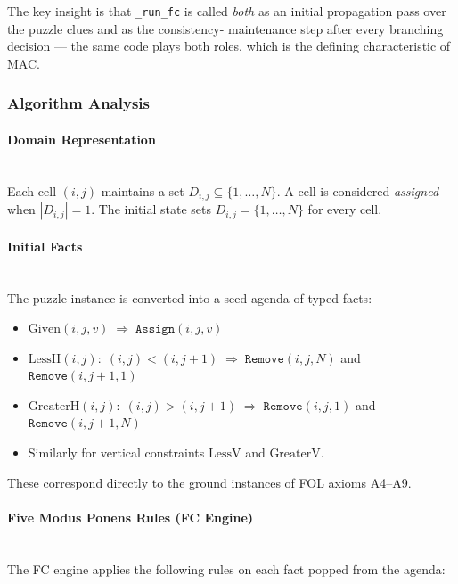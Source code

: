 The key insight is that \texttt{\_run\_fc} is called \emph{both} as an
initial propagation pass over the puzzle clues and as the consistency-
maintenance step after every branching decision — the same code plays both
roles, which is the defining characteristic of MAC.

\subsubsection{Algorithm Analysis}

\paragraph{Domain Representation}~\\
Each cell $(i,j)$ maintains a set $D_{i,j} \subseteq \{1,\ldots,N\}$.
A cell is considered \emph{assigned} when $|D_{i,j}| = 1$.
The initial state sets $D_{i,j} = \{1,\ldots,N\}$ for every cell.

\paragraph{Initial Facts}~\\
The puzzle instance is converted into a seed agenda of typed facts:
\begin{itemize}
    \item $\text{Given}(i,j,v) \;\Rightarrow\; \texttt{Assign}(i,j,v)$
    \item $\text{LessH}(i,j):\; (i,j) < (i,j{+}1) \;\Rightarrow\;
          \texttt{Remove}(i,j,N)$ and $\texttt{Remove}(i,j{+}1,1)$
    \item $\text{GreaterH}(i,j):\; (i,j) > (i,j{+}1) \;\Rightarrow\;
          \texttt{Remove}(i,j,1)$ and $\texttt{Remove}(i,j{+}1,N)$
    \item Similarly for vertical constraints $\text{LessV}$ and
          $\text{GreaterV}$.
\end{itemize}
These correspond directly to the ground instances of FOL axioms A4--A9.

\paragraph{Five Modus Ponens Rules (FC Engine)}~\\
The FC engine applies the following rules on each fact popped from the agenda:

